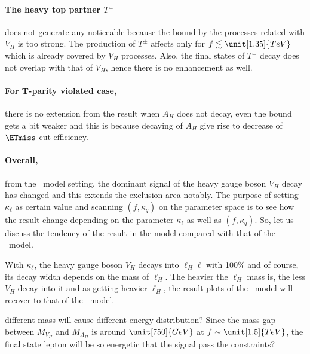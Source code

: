 \paragraph{The heavy top partner $T^\pm$} does not generate any noticeable because the bound by the processes related with $V_H$ is too strong.
The production of $T^\pm$ affects only for $f\lesssim\unit[1.35]{TeV}$ which is already covered by $V_H$ processes.
Also, the final states of $T^\pm$ decay does not overlap with that of $V_H$, hence there is no enhancement as well.

\paragraph{For T-parity violated case,} there is no extension from the result when $A_H$ does not decay,
even the bound gets a bit weaker and this is because decaying of $A_H$ give rise to decrease of $\ETmiss$ cut efficiency.


\paragraph{Overall,} from the \lil~model setting, the dominant signal of the heavy gauge boson $V_H$ decay has changed 
and this extends the exclusion area notably. 
The purpose of setting $\kappa_\ell$ as certain value and scanning $(f,\kappa_q)$ on the parameter space is 
to see how the result change depending on the parameter $\kappa_\ell$ as well as $(f, \kappa_q)$.
So, let us discuss the tendency of the result in the \lil model compared with that of the \fu~model.

With $\kappa_\ell$, the heavy gauge boson $V_H$ decays into $\ell_H \ell$ with 100\% and of course,
its decay width depends on the mass of $\ell_H$. The heavier the $\ell_H$ mass is, the less $V_H$ decay into it 
and as getting heavier $\ell_H$, the result plots of the \lil~model will recover to that of the \fu~model.


different mass will cause different energy distribution? 
Since the mass gap between $M_{V_H}$ and $M_{A_H}$ is around $\unit[750]{GeV}$ at $f \sim \unit[1.5]{TeV}$,
the final state lepton will be so energetic that the signal pass the constraints?


